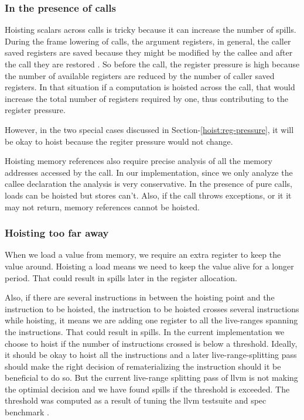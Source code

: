 \documentclass{sig-alternate}
\begin{document}
\subsubsection{In the presence of calls}
\label{cost:across-calls}
Hoisting scalars across calls is tricky because it can increase the number of
spills. During the frame lowering of calls, the argument registers, in general,
the caller saved registers are saved because they might be modified by the
callee and after the call they are restored \cite{frame-lowering}. So before the
call, the register pressure is high because the number of available registers
are reduced by the number of caller saved registers. In that situation if a
computation is hoisted across the call, that would increase the total number of
registers required by one, thus contributing to the register pressure.

However, in the two special cases discussed in Section-\ref{hoist:reg-pressure},
it will be okay to hoist because the regiter pressure would not change.

Hoisting memory references also require precise analysis of all the memory
addresses accessed by the call. In our implementation, since we only analyze the
callee declaration the analysis is very conservative. In the presence of pure
calls, loads can be hoisted but stores can't. Also, if the call throws exceptions,
or it it may not return, memory references cannot be hoisted.

\subsubsection{Hoisting too far away}
When we load a value from memory, we require an extra register to keep the value
around. Hoisting a load means we need to keep the value alive for a longer
period. That could result in spills later in the register allocation.

Also, if there are several instructions in between the hoisting point and the
instruction to be hoisted, the instruction to be hoisted crosses several
instructions while hoisting, it means we are adding one register to all the
live-ranges spanning the instructions. That could result in spills. In the
current implementation we choose to hoist if the number of instructions crossed
is below a threshold. Ideally, it should be okay to hoist all the instructions
and a later live-range-splitting pass should make the right decision of
rematerializing the instruction should it be beneficial to do so. But the
current live-range splitting pass of llvm is not making the optimial decision
and we have found spills if the threshold is exceeded. The threshold was
computed as a result of tuning the llvm testsuite \cite{llvm-nightly} and spec
benchmark \cite{Henning2000}.
\end{document}
